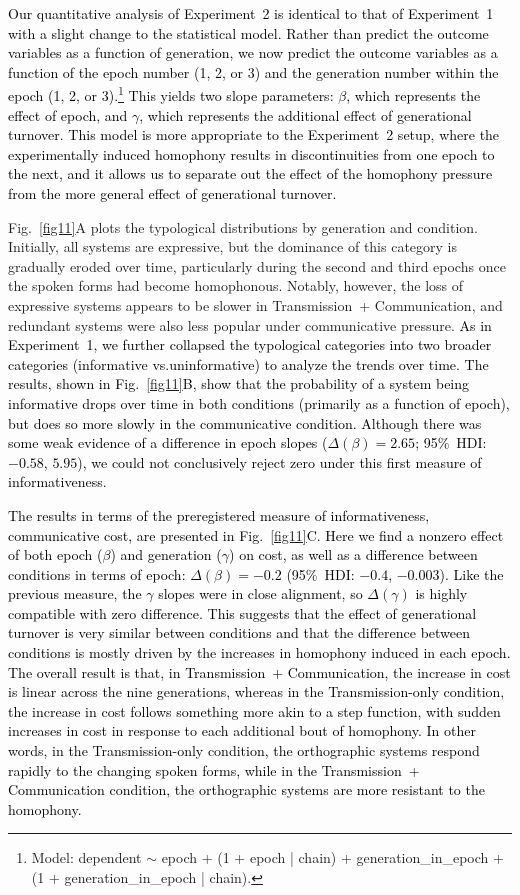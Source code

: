 \documentclass[doc,biblatex]{apa7}
\newcommand\newmaterial[1]{\textcolor{black}{#1}}
\newcommand\secondrevision[1]{\textcolor{black}{#1}}
\begin{document}
\newmaterial{Our quantitative analysis of Experiment~2 is identical to that of Experiment~1 with a slight change to the statistical model. Rather than predict the outcome variables as a function of generation, we now predict the outcome variables as a function of the epoch number (1, 2, or 3) and the generation number within the epoch (1, 2, or 3).\footnote{Model: dependent $\sim$ epoch + (1 + epoch | chain) + generation\_in\_epoch + (1 + generation\_in\_epoch | chain).} This yields two slope parameters: $\beta$, which represents the effect of epoch, and $\gamma$, which represents the additional effect of generational turnover. This model is more appropriate to the Experiment~2 setup, where the experimentally induced homophony results in discontinuities from one epoch to the next, and it allows us to separate out the effect of the homophony pressure from the more general effect of generational turnover.}

Fig.~\ref{fig11}A plots the typological distributions by generation and condition. Initially, all systems are expressive, but the dominance of this category is gradually eroded over time, particularly during the second and third epochs once the spoken forms had become homophonous. Notably, however, the loss of expressive systems appears to be slower in Transmission~+ Communication, and redundant systems were also less popular under communicative pressure. \newmaterial{As in Experiment~1, we further collapsed the typological categories into two broader categories (informative vs.\@ uninformative) to analyze the trends over time. The results, shown in Fig.~\ref{fig11}B, show that the probability of a system being informative drops over time in both conditions (primarily as a function of epoch), but does so more slowly in the communicative condition. Although there was some weak evidence of a difference in epoch slopes ($\Delta(\beta) = 2.65$; 95\%~HDI: $-0.58$, $5.95$), we could not conclusively reject zero under this first measure of informativeness.}

\newmaterial{The results in terms of the preregistered measure of informativeness, communicative cost, are presented in Fig.~\ref{fig11}C. Here we find a nonzero effect of both epoch \secondrevision{($\beta$)} and generation \secondrevision{($\gamma$)} on cost, as well as a difference between conditions in terms of epoch: $\Delta(\beta) = -0.2$ (95\%~HDI: $-0.4$, $-0.003$). Like the previous measure, the $\gamma$ slopes were in close alignment\secondrevision{, so $\Delta(\gamma)$ is highly compatible with zero difference}. This suggests that the effect of generational turnover is very similar between conditions and that the difference between conditions is mostly driven by the increases in homophony induced in each epoch. The overall result is that, in Transmission~+ Communication, the increase in cost is linear across the nine generations, whereas in the Transmission-only condition, the increase in cost follows something more akin to a step function, with sudden increases in cost in response to each additional bout of homophony. In other words, in the Transmission-only condition, the orthographic systems respond rapidly to the changing spoken forms, while in the Transmission~+ Communication condition, the orthographic systems are more resistant to the homophony.}
\end{document}
